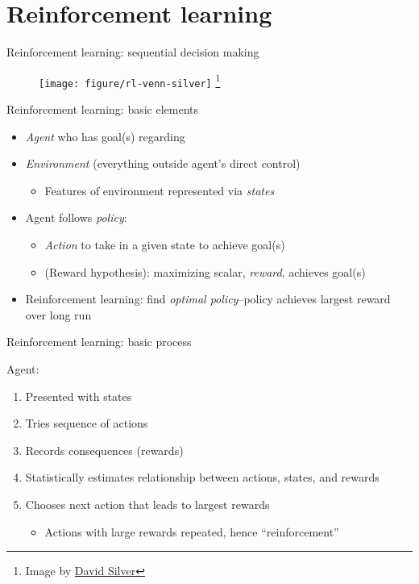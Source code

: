 \documentclass{beamer}
\newcommand\blfootnote[1]{%
  \begingroup
  \renewcommand\thefootnote{}\footnote{#1}%
  \addtocounter{footnote}{-1}%
  \endgroup
}
\begin{document}
\section{Reinforcement learning} %
\label{sec:reinforcement_learning}

\begin{frame}[c]{Reinforcement learning: sequential decision making}
  \begin{figure}
    \centering
    \texttt{[image: figure/rl-venn-silver]}\blfootnote{\scriptsize Image by \href{http://www0.cs.ucl.ac.uk/staff/D.Silver/web/Teaching.html}{David Silver}}
  \end{figure}
\end{frame}

\begin{frame}[c]{Reinforcement learning: basic elements}

\begin{itemize}[<+->]
  \item \emph{Agent} who has goal(s) regarding
  \item \emph{Environment} (everything outside agent's direct control)
  \begin{itemize}
    \item Features of environment represented via \emph{states}
  \end{itemize}
  \item Agent follows \emph{policy}: 
  \begin{itemize}
    \item \emph{Action} to take in a given state to achieve goal(s)
    \item (Reward hypothesis): maximizing scalar, \emph{reward}, achieves goal(s) 
  \end{itemize}
  \item Reinforcement learning: find \emph{optimal policy}--policy achieves largest reward over long run 
\end{itemize}

\end{frame}

\begin{frame}[c]{Reinforcement learning: basic process}

Agent:
\begin{enumerate}[<+->]
  \item Presented with states
  \item Tries sequence of actions
  \item Records consequences (rewards)
  \item Statistically estimates relationship between actions, states, and rewards
  \item Chooses next action that leads to largest rewards
  \begin{itemize}
    \item Actions with large rewards repeated, hence ``reinforcement''
  \end{itemize}
\end{enumerate}
\end{frame}
\end{document}

